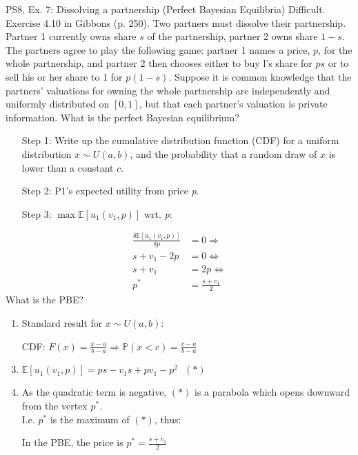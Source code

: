 \begin{frame}{PS8, Ex. 7: Dissolving a partnership (Perfect Bayesian Equilibria)}
    Difficult. Exercise 4.10 in Gibbons (p. 250). Two partners must dissolve their partnership. Partner 1 currently owns share $s$ of the partnership, partner 2 owns share $1-s$. The partners agree to play the following game: partner 1 names a price, $p$, for the whole partnership, and partner 2 then chooses either to buy l's share for $ps$ or to sell his or her share to 1 for $p(1-s)$. Suppose it is common knowledge that the partners' valuations for owning the whole partnership are independently and uniformly distributed on $[0,1]$, but that each partner's valuation is private information. What is the perfect Bayesian equilibrium?\vspace{-11pt}
    \begin{multicols}{2}
      \begin{itemize}
        \item[Step 1:] Write up the cumulative distribution function (CDF) for a uniform distribution $x\sim U(a, b)$, and the probability that a random draw of $x$ is lower than a constant $c$.
        \item[Step 2:] P1's expected utility from price \textit{p}.
        \item[Step 3:] $\max\mathbb{E}[u_1(v_1,p)]$ wrt. \textit{p}:
      \end{itemize}\vspace{-6pt}
      \begin{align*}
        \frac{\delta \mathbb{E}[u_1(v_1,p)]}{\delta p}&=0\Rightarrow\\
        s+v_1-2p&=0\Leftrightarrow\\
        s+v_1&=2p\Leftrightarrow\\
        p^*&=\frac{s+v_1}{2}
      \end{align*}
      What is the PBE?
      \vfill\null\columnbreak
      \begin{enumerate}
        \item Standard result for $x\sim U(a, b):$
        \item[CDF:] $F(x)=\frac{x-a}{b-a}\Rightarrow\mathbb{P}(x<c)=\frac{c-a}{b-a}$
        \item $\mathbb{E}[u_1(v_1,p)]=ps-v_1s+pv_1-p^2\ \ \ (*)$
        \item As the quadratic term is negative, $(*)$ is a parabola which opens downward from the vertex $p^*$.\\
        I.e. $p^*$ is the maximum of $(*)$, thus:
        \item[] In the PBE, the price is $p^*=\frac{s+v_1}{2}$
      \end{enumerate}
      \vfill\null
    \end{multicols}
\end{frame}
